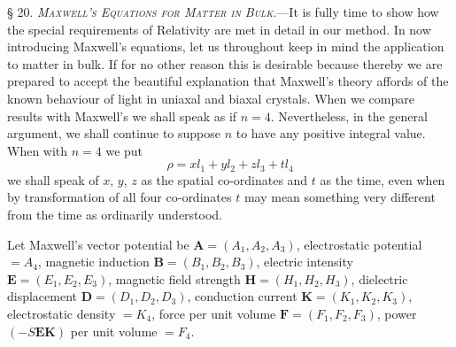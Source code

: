 \documentclass[11pt]{article}
\begin{document}
\noindent\textsc{§ 20. \emph{Maxwell's Equations for Matter in Bulk.}}---It is fully time to show how the special requirements of Relativity are met in detail in our method. In now introducing Maxwell's equations, let us throughout keep in mind the application to matter in bulk. If for no other reason this is desirable because thereby we are prepared to accept the beautiful explanation that Maxwell's theory affords of the known behaviour of light in uniaxal and biaxal crystals. When we compare results with Maxwell's we shall speak as if $n=4$. Nevertheless, in the general argument, we shall continue to suppose $n$ to have any positive integral value. When with $n=4$ we put
\[
  \rho=xl_1+yl_2+zl_3+tl_4
\]
we shall speak of $x$, $y$, $z$ as the spatial co-ordinates and $t$ as the time, even when by transformation of all four co-ordinates $t$ may mean something very different from the time as ordinarily understood.

\indent Let Maxwell's vector potential be $\mathbf{A}=(A_1,A_2,A_3)$, electrostatic potential $=A_4$, magnetic induction $\mathbf{B}=(B_1,B_2,B_3)$, electric intensity $\mathbf{E}=(E_1,E_2,E_3)$, magnetic field strength $\mathbf{H}=(H_1,H_2,H_3)$, dielectric displacement $\mathbf{D}=(D_1,D_2,D_3)$, conduction current $\mathbf{K}=(K_1,K_2,K_3)$, electrostatic density $=K_4$, force per unit volume $\mathbf{F}=(F_1,F_2,F_3)$, power $(-S\mathbf{E}\mathbf{K})$ per unit volume $=F_4$.
\end{document}
